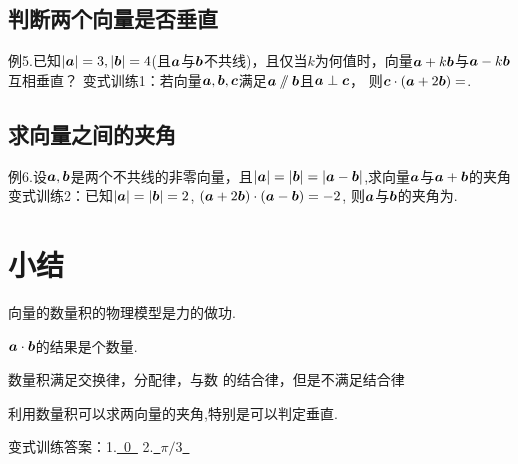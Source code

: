 \documentclass[twoside,12pt]{article}\usepackage[includemp=true,marginparsep=.5cm,marginparwidth=3cm,left=1.7cm,right=.7cm,top=2cm,bottom=1.5cm]{geometry}\newtheorem{Definition}{定义}[section]
\begin{document}
\subsection{判断两个向量是否垂直}
例5.已知$|\bm a|=3, |\bm b|=4$(且$\bm a$与$\bm b$不共线)，且仅当$k$为何值时，向量$\bm a+k\bm b$与$\bm a-k\bm b$互相垂直？
\myskip
变式训练1：若向量$\bm a,\bm b,\bm c$满足$\bm a\sslash\bm b$且$\bm a\perp\bm c$，
则$\bm c\cdot(\bm a+2\bm b)=$\lines.
\subsection{求向量之间的夹角}
例6.设$\bm a,\bm b$是两个不共线的非零向量，且$|\bm a|=|\bm b|=|\bm a-\bm b|$,求向量$\bm a$与$\bm a+\bm b$的夹角
\myskip
变式训练2：已知$|\bm a|=|\bm b|=2$, $(\bm a+2\bm b)\cdot(\bm a-\bm b)=-2$, 则$\bm a$与$\bm b$的夹角为\lines.
\myskip

\section{小结}
\begin{itemize*}
  \item 向量的数量积的物理模型是力的做功.
  \item $\bm a\cdot\bm b$的结果是个数量.
  \item 数量积满足交换律，分配律，与数
的结合律，但是不满足结合律
  \item 利用数量积可以求两向量的夹角,特别是可以判定垂直.
\end{itemize*}
变式训练答案：1.\underline{~0~} 2.\underline{~$\pi/3$~}
\end{document}
